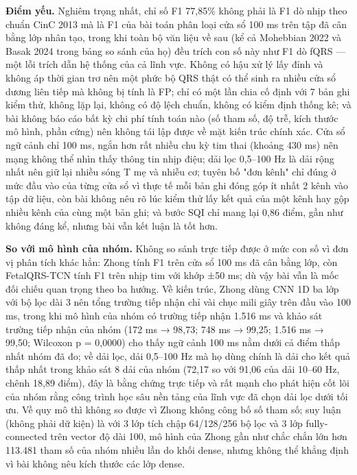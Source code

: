 \documentclass[12pt,a4paper]{article}
\begin{document}
\noindent \textbf{Điểm yếu.} Nghiêm trọng nhất, chỉ số F1 77,85\% không phải là F1 dò nhịp theo chuẩn CinC 2013 mà là F1 của bài toán phân loại cửa sổ 100 ms trên tập đã cân bằng lớp nhân tạo, trong khi toàn bộ văn liệu về sau (kể cả Mohebbian 2022 và Basak 2024 trong bảng so sánh của họ) đều trích con số này như F1 dò fQRS — một lỗi trích dẫn hệ thống của cả lĩnh vực. Không có hậu xử lý lấy đỉnh và không áp thời gian trơ nên một phức bộ QRS thật có thể sinh ra nhiều cửa sổ dương liên tiếp mà không bị tính là FP; chỉ có một lần chia cố định với 7 bản ghi kiểm thử, không lặp lại, không có độ lệch chuẩn, không có kiểm định thống kê; và bài không báo cáo bất kỳ chi phí tính toán nào (số tham số, độ trễ, kích thước mô hình, phần cứng) nên không tái lập được về mặt kiến trúc chính xác. Cửa sổ ngữ cảnh chỉ 100 ms, ngắn hơn rất nhiều chu kỳ tim thai (khoảng 430 ms) nên mạng không thể nhìn thấy thông tin nhịp điệu; dải lọc 0,5–100 Hz là dải rộng nhất nên giữ lại nhiều sóng T mẹ và nhiễu cơ; tuyên bố "đơn kênh" chỉ đúng ở mức đầu vào của từng cửa sổ vì thực tế mỗi bản ghi đóng góp ít nhất 2 kênh vào tập dữ liệu, còn bài không nêu rõ lúc kiểm thử lấy kết quả của một kênh hay gộp nhiều kênh của cùng một bản ghi; và bước SQI chỉ mang lại 0,86 điểm, gần như không đáng kể, nhưng bài vẫn kết luận là tốt hơn.\par\vspace{3pt}
\noindent \textbf{\color{tdtblue}So với mô hình của nhóm.} Không so sánh trực tiếp được ở mức con số vì đơn vị phân tích khác hẳn: Zhong tính F1 trên cửa sổ 100 ms đã cân bằng lớp, còn FetalQRS-TCN tính F1 trên nhịp tim với khớp ±50 ms; dù vậy bài vẫn là mốc đối chiếu quan trọng theo ba hướng. Về kiến trúc, Zhong dùng CNN 1D ba lớp với bộ lọc dài 3 nên tổng trường tiếp nhận chỉ vài chục mili giây trên đầu vào 100 ms, trong khi mô hình của nhóm có trường tiếp nhận 1.516 ms và khảo sát trường tiếp nhận của nhóm (172 ms → 98,73; 748 ms → 99,25; 1.516 ms → 99,50; Wilcoxon p = 0,0000) cho thấy ngữ cảnh 100 ms nằm dưới cả điểm thấp nhất nhóm đã đo; về dải lọc, dải 0,5–100 Hz mà họ dùng chính là dải cho kết quả thấp nhất trong khảo sát 8 dải của nhóm (72,17 so với 91,06 của dải 10–60 Hz, chênh 18,89 điểm), đây là bằng chứng trực tiếp và rất mạnh cho phát hiện cốt lõi của nhóm rằng công trình học sâu nền tảng của lĩnh vực đã chọn dải lọc dưới tối ưu. Về quy mô thì không so được vì Zhong không công bố số tham số; suy luận (không phải dữ kiện) là với 3 lớp tích chập 64/128/256 bộ lọc và 3 lớp fully-connected trên vector độ dài 100, mô hình của Zhong gần như chắc chắn lớn hơn 113.481 tham số của nhóm nhiều lần do khối dense, nhưng không thể khẳng định vì bài không nêu kích thước các lớp dense.\par\vspace{3pt}
\end{document}
